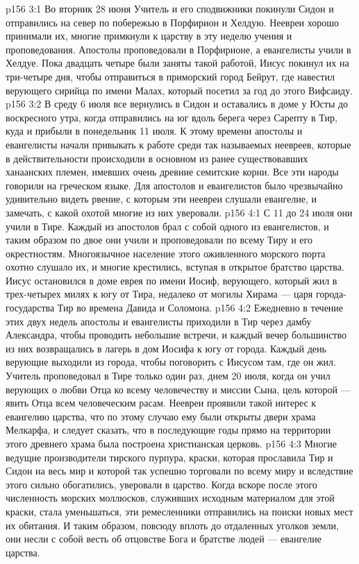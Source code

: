 \vs p156 3:1 Во вторник 28 июня Учитель и его сподвижники покинули Сидон и отправились на север по побережью в Порфирион и Хелдую. Неевреи хорошо принимали их, многие примкнули к царству в эту неделю учения и проповедования. Апостолы проповедовали в Порфирионе, а евангелисты учили в Хелдуе. Пока двадцать четыре были заняты такой работой, Иисус покинул их на три\hyp{}четыре дня, чтобы отправиться в приморский город Бейрут, где навестил верующего сирийца по имени Малах, который посетил за год до этого Вифсаиду.
\vs p156 3:2 В среду 6 июля все вернулись в Сидон и оставались в доме у Юсты до воскресного утра, когда отправились на юг вдоль берега через Сарепту в Тир, куда и прибыли в понедельник 11 июля. К этому времени апостолы и евангелисты начали привыкать к работе среди так называемых неевреев, которые в действительности происходили в основном из ранее существовавших ханаанских племен, имевших очень древние семитские корни. Все эти народы говорили на греческом языке. Для апостолов и евангелистов было чрезвычайно удивительно видеть рвение, с которым эти неевреи слушали евангелие, и замечать, с какой охотой многие из них уверовали.
\vs p156 4:1 С 11 до 24 июля они учили в Тире. Каждый из апостолов брал с собой одного из евангелистов, и таким образом по двое они учили и проповедовали по всему Тиру и его окрестностям. Многоязычное население этого оживленного морского порта охотно слушало их, и многие крестились, вступая в открытое братство царства. Иисус остановился в доме еврея по имени Иосиф, верующего, который жил в трех\hyp{}четырех милях к югу от Тира, недалеко от могилы Хирама --- царя города\hyp{}государства Тир во времена Давида и Соломона.
\vs p156 4:2 Ежедневно в течение этих двух недель апостолы и евангелисты приходили в Тир через дамбу Александра, чтобы проводить небольшие встречи, и каждый вечер большинство из них возвращались в лагерь в дом Иосифа к югу от города. Каждый день верующие выходили из города, чтобы поговорить с Иисусом там, где он жил. Учитель проповедовал в Тире только один раз, днем 20 июля, когда он учил верующих о любви Отца ко всему человечеству и миссии Сына, цель которой --- явить Отца всем человеческим расам. Неевреи проявили такой интерес к евангелию царства, что по этому случаю ему были открыты двери храма Мелкарфа, и следует сказать, что в последующие годы прямо на территории этого древнего храма была построена христианская церковь.
\vs p156 4:3 Многие ведущие производители тирского пурпура, краски, которая прославила Тир и Сидон на весь мир и которой так успешно торговали по всему миру и вследствие этого сильно обогатились, уверовали в царство. Когда вскоре после этого численность морских моллюсков, служивших исходным материалом для этой краски, стала уменьшаться, эти ремесленники отправились на поиски новых мест их обитания. И таким образом, повсюду вплоть до отдаленных уголков земли, они несли с собой весть об отцовстве Бога и братстве людей --- евангелие царства.
